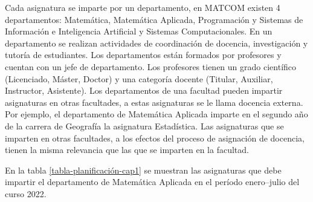 
Cada asignatura se imparte por un departamento,
en MATCOM existen 4 departamentos: Matemática, Matemática Aplicada,
Programación y Sistemas de Información e Inteligencia 
Artificial y Sistemas Computacionales.
En un departamento se realizan actividades de coordinación de docencia, investigación y 
tutoría de estudiantes. Los departamentos están formados por profesores
y cuentan con un jefe de departamento. Los profesores tienen 
un grado científico (Licenciado, Máster, Doctor) y una categoría docente (Titular, Auxiliar, Instructor, Asistente).
Los departamentos de una 
facultad pueden impartir asignaturas en otras facultades, a estas asignaturas se le llama docencia 
externa. Por ejemplo, el departamento de 
Matemática Aplicada imparte en el segundo año de la carrera de Geografía la asignatura 
Estadística. Las asignaturas que se imparten en otras facultades, a los efectos del proceso de asignación de docencia,
tienen la misma relevancia que las que se imparten en la facultad. 

En la tabla \ref{tabla-planificación-cap1} se muestran las asignaturas que debe impartir 
el departamento de Matemática Aplicada en el período enero--julio del curso 2022.


